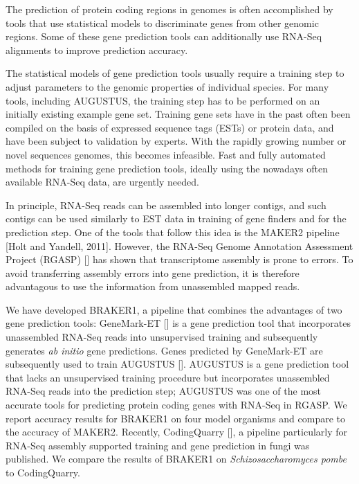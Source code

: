 \documentclass{bioinfo}
\begin{document}
The prediction of protein coding regions in genomes is often accomplished by tools that use statistical models to discriminate genes from other genomic regions. Some of these gene prediction tools can additionally use RNA-Seq alignments to improve prediction accuracy.

The statistical models of gene prediction tools usually require a training  step to adjust parameters to the genomic properties of individual species. For many tools, including AUGUSTUS, the training step has to be performed on an initially existing example gene set. Training gene sets have in the past often been compiled on the basis of expressed sequence tags (ESTs) or protein data, and have been subject to validation by experts. With the rapidly growing number or novel sequences genomes, this becomes infeasible. Fast and fully automated methods for training gene prediction tools, ideally using the nowadays often available RNA-Seq data, are urgently needed.

In principle, RNA-Seq reads can be assembled into longer contigs, and such contigs can be used similarly to EST data in training of gene finders and for the prediction step. One of the tools that follow this idea is the MAKER2 pipeline [Holt and Yandell, 2011]. However, the RNA-Seq Genome Annotation Assessment Project (RGASP) [\cite{RGASP}] has shown that transcriptome assembly is prone to errors. To avoid transferring assembly errors into gene prediction, it is therefore advantagous to use the information from unassembled mapped reads.

We have developed BRAKER1, a pipeline that combines the advantages of two gene prediction tools: GeneMark-ET [\cite{GeneMark-ET}] is a gene prediction tool that incorporates unassembled RNA-Seq reads into unsupervised training and subsequently generates \textit{ab initio} gene predictions.  Genes predicted by GeneMark-ET are subsequently used to train AUGUSTUS [\cite{AUGUSTUS}]. AUGUSTUS is a gene prediction tool that lacks an unsupervised training procedure but incorporates unassembled RNA-Seq reads into the prediction step; AUGUSTUS was one of the most accurate tools for predicting protein coding genes with RNA-Seq in RGASP. We report accuracy results for BRAKER1 on four model organisms and compare to the accuracy of MAKER2. Recently, CodingQuarry [\cite{CodingQuarry}], a pipeline particularly for RNA-Seq assembly supported training and gene prediction in fungi was published. We compare the results of BRAKER1 on \textit{Schizosaccharomyces pombe} to CodingQuarry.
\end{document}
